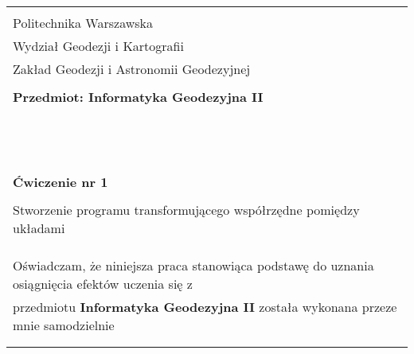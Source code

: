 \documentclass[12pt, a4paper]{article}
\begin{document}
\begin{table}[!htb]
\centering
\begin{tabular}{|p{8cm}|p{7cm}|} \hline
			\multicolumn{2}{|l|}{ } \\
			\multicolumn{2}{|l|}{ Politechnika Warszawska}\\
			\multicolumn{2}{|l|}{Wydział Geodezji i Kartografii}\\  
			\multicolumn{2}{|l|}{Zakład Geodezji i Astronomii Geodezyjnej}\\  
			\multicolumn{2}{|l|}{ } \\
			\multicolumn{2}{|l|}{\textbf{Przedmiot: Informatyka Geodezyjna II }}\\ 
			\multicolumn{2}{|l|}{ } \\ \hline 
			\multicolumn{2}{|l|}{ } \\
			\multicolumn{2}{|l|}{ } \\
			\multicolumn{2}{|l|}{ } \\
			\multicolumn{2}{|l|}{ } \\
			\multicolumn{2}{|l|}{ } \\
			\multicolumn{2}{|l|}{ } \\
			\multicolumn{2}{|l|}{ } \\
			\multicolumn{2}{|l|}{ } \\
			\multicolumn{2}{|l|}{ } \\
			\multicolumn{2}{|l|}{ } \\
			\multicolumn{2}{|l|}{ } \\
			\multicolumn{2}{|l|}{ } \\
			\multicolumn{2}{|l|}{\LARGE{\textbf{Ćwiczenie nr 1}}}\\ 
			\multicolumn{2}{|l|}{ } \\
			\multicolumn{2}{|l|}{\Large{Stworzenie programu transformującego współrzędne pomiędzy układami}}\\  
			\multicolumn{2}{|l|}{\Large}\\
			\multicolumn{2}{|l|}{ } \\
			\multicolumn{2}{|l|}{ } \\
			\multicolumn{2}{|l|}{\small{Oświadczam, że niniejsza praca stanowiąca podstawę do uznania osiągnięcia efektów uczenia się z}} \\
			\multicolumn{2}{|l|}{\small{przedmiotu \textbf{Informatyka Geodezyjna II} została wykonana przeze mnie samodzielnie}} \\
			\multicolumn{2}{|l|}{ } \\
			\multicolumn{2}{|l|}{ } \\

\end{tabular}
\end{table}
\end{document}
